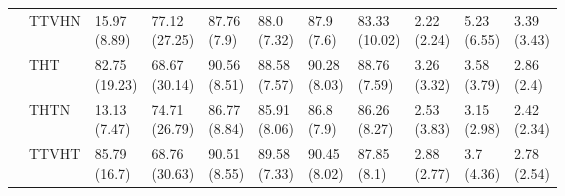 \begin{table}
\begin{tabular}{lllllllllll}
       & TTVHN &   \makecell{15.97\\(8.89)} &  \makecell{77.12\\(27.25)} &    \makecell{87.76\\(7.9)} &   \makecell{88.0\\(7.32)} &    \makecell{87.9\\(7.6)} &  \makecell{83.33\\(10.02)} &      \makecell{2.22\\(2.24)} &  \makecell{5.23\\(6.55)} &  \makecell{3.39\\(3.43)} \\
       & THT &  \makecell{82.75\\(19.23)} &  \makecell{68.67\\(30.14)} &   \makecell{90.56\\(8.51)} &  \makecell{88.58\\(7.57)} &  \makecell{90.28\\(8.03)} &   \makecell{88.76\\(7.59)} &      \makecell{3.26\\(3.32)} &  \makecell{3.58\\(3.79)} &   \makecell{2.86\\(2.4)} \\
       & THTN &   \makecell{13.13\\(7.47)} &  \makecell{74.71\\(26.79)} &   \makecell{86.77\\(8.84)} &  \makecell{85.91\\(8.06)} &    \makecell{86.8\\(7.9)} &   \makecell{86.26\\(8.27)} &      \makecell{2.53\\(3.83)} &  \makecell{3.15\\(2.98)} &  \makecell{2.42\\(2.34)} \\
       & TTVHT &   \makecell{85.79\\(16.7)} &  \makecell{68.76\\(30.63)} &   \makecell{90.51\\(8.55)} &  \makecell{89.58\\(7.33)} &  \makecell{90.45\\(8.02)} &    \makecell{87.85\\(8.1)} &      \makecell{2.88\\(2.77)} &   \makecell{3.7\\(4.36)} &  \makecell{2.78\\(2.54)} \\

\end{tabular}
\end{table}
